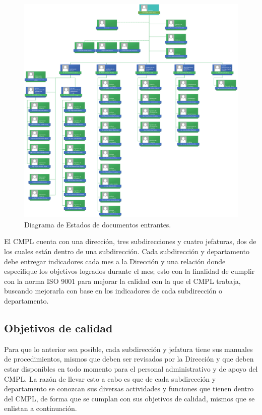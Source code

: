 	\begin{figure}[htbp!]
		\centering
			\includegraphics[width=1\textwidth]{images/antecedentes/OrganigramaCMPL.png}
		\caption{Diagrama de Estados de documentos entrantes.}
		\label{fig:organigrama}
	\end{figure}
	
	El CMPL cuenta con una dirección, tres subdirecciones y cuatro jefaturas, dos de los cuales están dentro de una subdirección. Cada subdirección y departamento debe entregar indicadores cada mes a la Dirección y una relación donde especifique los objetivos logrados durante el mes; esto con la finalidad de cumplir con la norma ISO 9001 para mejorar la calidad con la que el CMPL trabaja, buscando mejorarla con base en los indicadores de cada subdirección o departamento.\\
	
	\subsection{Objetivos de calidad}
	Para que lo anterior sea posible, cada subdirección y jefatura tiene sus manuales de procedimientos, mismos que deben ser revisados por la Dirección y que deben estar disponibles en todo momento para el personal administrativo y de apoyo del CMPL. La razón de llevar esto a cabo es que de cada subdirección y departamento se conozcan sus diversas actividades y funciones que tienen dentro del CMPL, de forma que se cumplan con sus objetivos de calidad, mismos que se enlistan a continuación.\\
	
